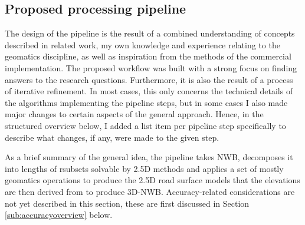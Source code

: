 \subsection{Proposed processing pipeline}
\label{sub:pipelineoverview}

The design of the pipeline is the result of a combined understanding of concepts described in related work, my own knowledge and experience relating to the geomatics discipline, as well as inspiration from the methods of the commercial implementation. The proposed workflow was built with a strong focus on finding answers to the research questions. Furthermore, it is also the result of a process of iterative refinement. In most cases, this only concerns the technical details of the algorithms implementing the pipeline steps, but in some cases I also made major changes to certain aspects of the general approach. Hence, in the structured overview below, I added a list item per pipeline step specifically to describe what changes, if any, were made to the given step.

As a brief summary of the general idea, the pipeline takes NWB, decomposes it into lengths of rsubsets solvable by 2.5D methods and applies a set of mostly geomatics operations to produce the 2.5D road surface models that the elevations are then derived from to produce 3D-NWB. Accuracy-related considerations are not yet described in this section, these are first discussed in Section \ref{sub:accuracyoverview} below.

